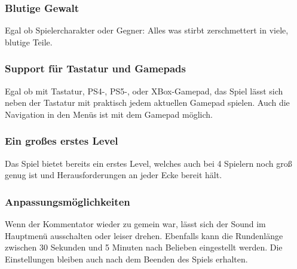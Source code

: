 \subsubsection*{Blutige Gewalt}
Egal ob Spielercharakter oder Gegner: Alles was stirbt zerschmettert in viele, blutige Teile. 

\subsubsection*{Support für Tastatur und Gamepads}
Egal ob mit Tastatur, PS4-, PS5-, oder XBox-Gamepad, das Spiel lässt sich neben der Tastatur mit praktisch jedem aktuellen Gamepad spielen. Auch die Navigation in den Menüs ist mit dem Gamepad möglich.

\subsubsection*{Ein großes erstes Level}
Das Spiel bietet bereits ein erstes Level, welches auch bei 4 Spielern noch groß genug ist und Herausforderungen an jeder Ecke bereit hält.

\subsubsection*{Anpassungsmöglichkeiten}
Wenn der Kommentator wieder zu gemein war, lässt sich der Sound im Hauptmenü ausschalten oder leiser drehen. Ebenfalls kann die Rundenlänge zwischen 30 Sekunden und 5 Minuten nach Belieben eingestellt werden. Die Einstellungen bleiben auch nach dem Beenden des Spiels erhalten.
